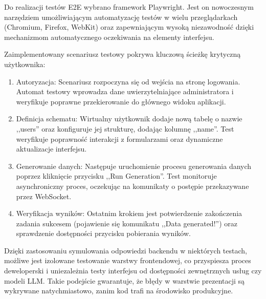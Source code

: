 Do realizacji testów \gls{E2E} wybrano framework Playwright. Jest on nowoczesnym narzędziem umożliwiającym automatyzację testów w wielu przeglądarkach (Chromium, Firefox, WebKit) oraz zapewniającym wysoką niezawodność dzięki mechanizmom automatycznego oczekiwania na elementy interfejsu.

Zaimplementowany scenariusz testowy pokrywa kluczową ścieżkę krytyczną\cite{happy_path} użytkownika:
\begin{enumerate}
    \item Autoryzacja: Scenariusz rozpoczyna się od wejścia na stronę logowania. Automat testowy wprowadza dane uwierzytelniające administratora i weryfikuje poprawne przekierowanie do głównego widoku aplikacji.
    \item Definicja schematu: Wirtualny użytkownik dodaje nową tabelę o nazwie ,,users'' oraz konfiguruje jej strukturę, dodając kolumnę ,,name''. Test weryfikuje poprawność interakcji z formularzami oraz dynamiczne aktualizacje interfejsu.
    \item Generowanie danych: Następuje uruchomienie procesu generowania danych poprzez kliknięcie przycisku ,,Run Generation''. Test monitoruje asynchroniczny proces, oczekując na komunikaty o postępie przekazywane przez WebSocket.
    \item Weryfikacja wyników: Ostatnim krokiem jest potwierdzenie zakończenia zadania sukcesem (pojawienie się komunikatu ,,Data generated!'') oraz sprawdzenie dostępności przycisku pobierania wyników.
\end{enumerate}

Dzięki zastosowaniu symulowania odpowiedzi backendu w niektórych testach, możliwe jest izolowane testowanie warstwy frontendowej, co przyspiesza proces deweloperski i uniezależnia testy interfejsu od dostępności zewnętrznych usług czy modeli \gls{LLM}. Takie podejście gwarantuje, że błędy w warstwie prezentacji są wykrywane natychmiastowo, zanim kod trafi na środowisko produkcyjne.


